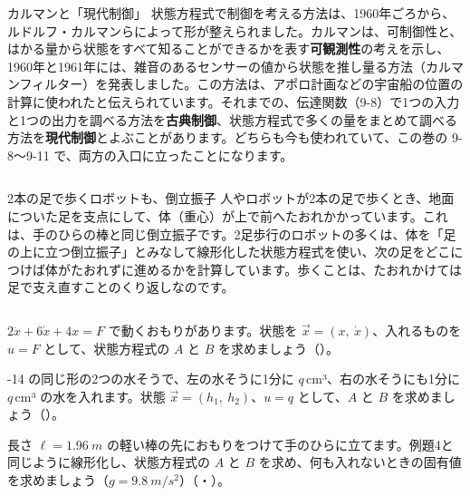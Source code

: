 \begin{column}{カルマンと「現代制御」}
状態方程式で制御を考える方法は、1960年ごろから、ルドルフ・カルマンらによって形が整えられました。カルマンは、可制御性と、はかる量から状態をすべて知ることができるかを表す\textbf{可観測性}の考えを示し、1960年と1961年には、雑音のあるセンサーの値から状態を推し量る方法（カルマンフィルター）を発表しました。この方法は、アポロ計画などの宇宙船の位置の計算に使われたと伝えられています。それまでの、伝達関数（9-8）で1つの入力と1つの出力を調べる方法を\textbf{古典制御}、状態方程式で多くの量をまとめて調べる方法を\textbf{現代制御}とよぶことがあります。どちらも今も使われていて、この巻の 9-8〜9-11 で、両方の入口に立ったことになります。
\end{column}



\begin{column}{2本の足で歩くロボットも、倒立振子}
人やロボットが2本の足で歩くとき、地面についた足を支点にして、体（重心）が上で前へたおれかかっています。これは、手のひらの棒と同じ倒立振子です。2足歩行のロボットの多くは、体を「足の上に立つ倒立振子」とみなして線形化した状態方程式を使い、次の足をどこにつけば体がたおれずに進めるかを計算しています。歩くことは、たおれかけては足で支え直すことのくり返しなのです。
\end{column}

\bkendproblems
{}

\bkproblem $2\ddot x+6\dot x+4x=F$ で動くおもりがあります。状態を $\vec x=(x,\ \dot x)$、入れるものを $u=F$ として、状態方程式の $A$ と $B$ を求めましょう\mbox{（）}。

-14 の同じ形の2つの水そうで、左の水そうに1分に $q$\,cm³、右の水そうにも1分に $q$\,cm³ の水を入れます。状態 $\vec x=(h_1,\ h_2)$、$u=q$ として、$A$ と $B$ を求めましょう\mbox{（）}。

\bkproblem 長さ $\ell=\qty{1.96}{m}$ の軽い棒の先におもりをつけて手のひらに立てます。例題4と同じように線形化し、状態方程式の $A$ と $B$ を求め、何も入れないときの固有値を求めましょう（$g=\qty{9.8}{m/s^2}$）\mbox{（・）}。

